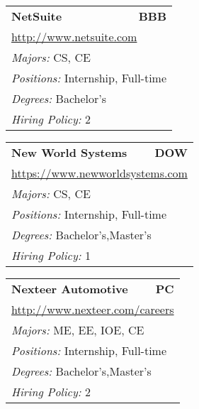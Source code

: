 \documentclass[twoside]{article}
\begin{document}
\begin{center}
\begin{multicols}{3}
\begin{FlushLeft}
\begin{minipage}{\columnwidth}\begin{tabularx}{.95\columnwidth}{Xr}
                 {\Large\bf NetSuite} & {\Large\bf BBB}\\
    \multicolumn{2}{p{.95\columnwidth}}{\url{http://www.netsuite.com}}\\
    \multicolumn{2}{p{.95\columnwidth}}{\emph{Majors:} CS, CE}\\
    \multicolumn{2}{p{.95\columnwidth}}{\emph{Positions:} Internship, Full-time}\\
    \multicolumn{2}{p{.95\columnwidth}}{\emph{Degrees:} Bachelor's}\\
    \multicolumn{2}{p{.95\columnwidth}}{\emph{Hiring Policy:} 2}\\
    \end{tabularx}
    
\end{minipage}
 
\begin{minipage}{\columnwidth}\begin{tabularx}{.95\columnwidth}{Xr}
                 {\Large\bf New World Systems} & {\Large\bf DOW}\\
    \multicolumn{2}{p{.95\columnwidth}}{\url{https://www.newworldsystems.com}}\\
    \multicolumn{2}{p{.95\columnwidth}}{\emph{Majors:} CS, CE}\\
    \multicolumn{2}{p{.95\columnwidth}}{\emph{Positions:} Internship, Full-time}\\
    \multicolumn{2}{p{.95\columnwidth}}{\emph{Degrees:} Bachelor's,Master's}\\
    \multicolumn{2}{p{.95\columnwidth}}{\emph{Hiring Policy:} 1}\\
    \end{tabularx}
    
\end{minipage}
 
\begin{minipage}{\columnwidth}\begin{tabularx}{.95\columnwidth}{Xr}
                 {\Large\bf Nexteer Automotive} & {\Large\bf PC}\\
    \multicolumn{2}{p{.95\columnwidth}}{\url{http://www.nexteer.com/careers}}\\
    \multicolumn{2}{p{.95\columnwidth}}{\emph{Majors:} ME, EE, IOE, CE}\\
    \multicolumn{2}{p{.95\columnwidth}}{\emph{Positions:} Internship, Full-time}\\
    \multicolumn{2}{p{.95\columnwidth}}{\emph{Degrees:} Bachelor's,Master's}\\
    \multicolumn{2}{p{.95\columnwidth}}{\emph{Hiring Policy:} 2}\\
    \end{tabularx}
    

\end{minipage}
\end{FlushLeft}
\end{multicols}
\end{center}
\end{document}
